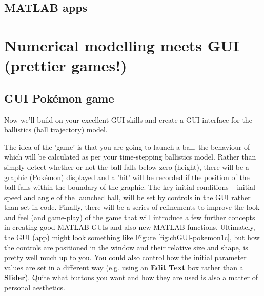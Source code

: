 \documentclass{tufte-book} %
\begin{document}

\section{\textbf{MATLAB} apps}


%

\chapter{Numerical modelling meets GUI (prettier games!)}
\label{ch:10}


\newpage


\section{GUI Pok\'emon game}

Now we'll build on your excellent GUI skills and create a GUI interface for the ballistics (ball trajectory) model.

The idea of the 'game' is that you are going to launch a ball, the behaviour of which will be calculated as per your time-stepping ballistics model. Rather than simply detect whether or not the ball falls below zero (height), there will be a graphic (Pok\'emon) displayed and a 'hit' will be recorded if the position of the ball falls within the boundary of the graphic. The key initial conditions -- initial speed and angle of the launched ball, will be set by controls in the GUI rather than set in code. Finally, there will be a series of refinements to improve the look and feel (and game-play) of the game that will introduce a few further concepts in creating good MATLAB GUIs and also new MATLAB functions. 
Ultimately, the GUI (app) might look something like Figure \ref{fig:chGUI-pokemon1c}, but how the controls are positioned in the window and their relative size and shape, is pretty well much up to you. You could also control how the initial parameter values are set in a different way (e.g. using an \textbf{Edit Text} box rather than a \textbf{Slider}). Quite what buttons you want and how they are used is also a matter of personal aesthetics. 
\end{document}
